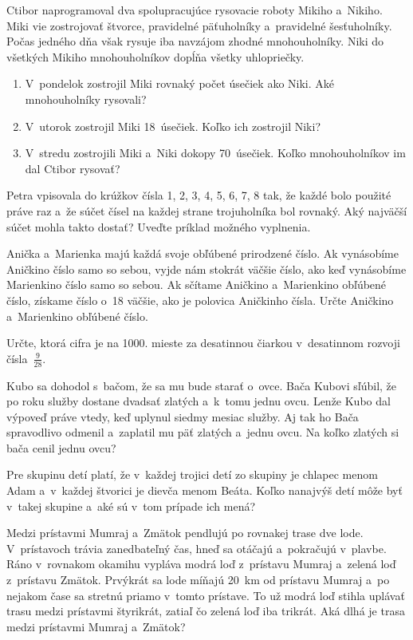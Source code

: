 {%
Ctibor naprogramoval dva spolupracujúce rysovacie roboty Mikiho a~Nikiho.
Miki vie zostrojovať štvorce, pravidelné päťuholníky a~pravidelné šesťuholníky.
Počas jedného dňa však rysuje iba navzájom zhodné mnohouholníky.
Niki do všetkých Mikiho mnohouholníkov dopĺňa všetky uhlopriečky.
\begin{enumerate}
\item V~pondelok zostrojil Miki rovnaký počet úsečiek ako Niki.
Aké mnohouholníky rysovali?
\item V~utorok zostrojil Miki 18~úsečiek.
Koľko ich zostrojil Niki?
\item V~stredu zostrojili Miki a~Niki dokopy 70~úsečiek. Koľko mnohouholníkov im dal Ctibor rysovať?
\end{enumerate}
}

{%
Petra vpisovala do krúžkov čísla 1, 2, 3, 4, 5, 6, 7, 8 tak, že každé bolo použité práve raz a~že súčet čísel na každej strane trojuholníka bol rovnaký.
Aký najväčší súčet mohla takto dostať?
Uveďte príklad možného vyplnenia.
}

{%
Anička a~Marienka majú každá svoje obľúbené prirodzené číslo.
Ak vynásobíme Aničkino číslo samo so sebou, vyjde nám stokrát väčšie číslo, ako keď vynásobíme Marienkino číslo samo so sebou.
Ak sčítame Aničkino a~Marienkino obľúbené číslo, získame číslo o~18 väčšie, ako je polovica Aničkinho čísla.
Určte Aničkino a~Marienkino obľúbené číslo.
}

{%
Určte, ktorá cifra je na 1000. mieste za desatinnou čiarkou v~desatinnom rozvoji čísla~$\frac9{28}$.
}

{%
Kubo sa dohodol s~bačom, že sa mu bude starať o~ovce.
Bača Kubovi sľúbil, že po roku služby dostane dvadsať zlatých a~k~tomu jednu ovcu.
Lenže Kubo dal výpoveď práve vtedy, keď uplynul siedmy mesiac služby.
Aj tak ho Bača spravodlivo odmenil a~zaplatil mu päť zlatých a~jednu ovcu.
Na koľko zlatých si bača cenil jednu ovcu?
}

{%
Pre skupinu detí platí, že v~každej trojici detí zo skupiny je chlapec menom Adam a~v~každej
štvorici je dievča menom Beáta.
Koľko nanajvýš detí môže byť v~takej skupine a~aké sú v~tom prípade ich mená?
}

{%
Medzi prístavmi Mumraj a~Zmätok pendlujú po rovnakej trase dve lode.
V~prístavoch trávia zanedbateľný čas, hneď sa otáčajú a~pokračujú v~plavbe.
Ráno v~rovnakom okamihu vypláva modrá loď z~prístavu Mumraj a~zelená loď z~prístavu Zmätok.
Prvýkrát sa lode míňajú 20~km od prístavu Mumraj a~po nejakom čase sa stretnú priamo v~tomto prístave.
To už modrá loď stihla uplávať trasu medzi prístavmi štyrikrát, zatiaľ čo zelená loď iba trikrát.
Aká dlhá je trasa medzi prístavmi Mumraj a~Zmätok?
}

